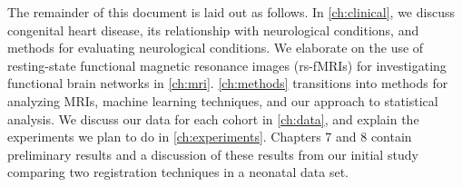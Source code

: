 The remainder of this document is laid out as follows. In \autoref{ch:clinical}, we discuss congenital heart disease, its relationship with neurological conditions, and methods for evaluating neurological conditions. We elaborate on the use of resting-state functional magnetic resonance images (rs-fMRIs) for investigating functional brain networks in \autoref{ch:mri}. \autoref{ch:methods} transitions into methods for analyzing MRIs, machine learning techniques, and our approach to statistical analysis. We discuss our data for each cohort in \autoref{ch:data}, and explain the experiments we plan to do in \autoref{ch:experiments}. 
Chapters 7 and 8 contain preliminary results and a discussion of these results from our initial study comparing two registration techniques in a neonatal data set.